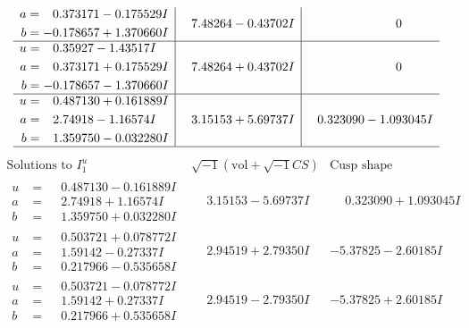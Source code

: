 \documentclass[1p]{elsarticle_modified}
\theoremstyle{definition}
\newcommand{\I}{\sqrt{-1}}
\begin{document}
$$\begin{array}{c|c|c}
\begin{aligned}
a &= \phantom{-}0.373171 - 0.175529 I \\
b &= -0.178657 + 1.370660 I\end{aligned}
 & \phantom{-}7.48264 - 0.43702 I & \phantom{-0.000000 } 0 \\ \hline\begin{aligned}
u &= \phantom{-}0.35927 - 1.43517 I \\
a &= \phantom{-}0.373171 + 0.175529 I \\
b &= -0.178657 - 1.370660 I\end{aligned}
 & \phantom{-}7.48264 + 0.43702 I & \phantom{-0.000000 } 0 \\ \hline\begin{aligned}
u &= \phantom{-}0.487130 + 0.161889 I \\
a &= \phantom{-}2.74918 - 1.16574 I \\
b &= \phantom{-}1.359750 - 0.032280 I\end{aligned}
 & \phantom{-}3.15153 + 5.69737 I & \phantom{-}0.323090 - 1.093045 I\\
 \hline 
 \end{array}$$\newpage$$\begin{array}{c|c|c}  
\text{Solutions to }I^u_{1}& \I (\text{vol} + \sqrt{-1}CS) & \text{Cusp shape}\\
 \hline 
\begin{aligned}
u &= \phantom{-}0.487130 - 0.161889 I \\
a &= \phantom{-}2.74918 + 1.16574 I \\
b &= \phantom{-}1.359750 + 0.032280 I\end{aligned}
 & \phantom{-}3.15153 - 5.69737 I & \phantom{-}0.323090 + 1.093045 I \\ \hline\begin{aligned}
u &= \phantom{-}0.503721 + 0.078772 I \\
a &= \phantom{-}1.59142 - 0.27337 I \\
b &= \phantom{-}0.217966 - 0.535658 I\end{aligned}
 & \phantom{-}2.94519 + 2.79350 I & -5.37825 - 2.60185 I \\ \hline\begin{aligned}
u &= \phantom{-}0.503721 - 0.078772 I \\
a &= \phantom{-}1.59142 + 0.27337 I \\
b &= \phantom{-}0.217966 + 0.535658 I\end{aligned}
 & \phantom{-}2.94519 - 2.79350 I & -5.37825 + 2.60185 I \\ \hline\begin{aligned}

\end{aligned}
\end{array}$$
\end{document}
